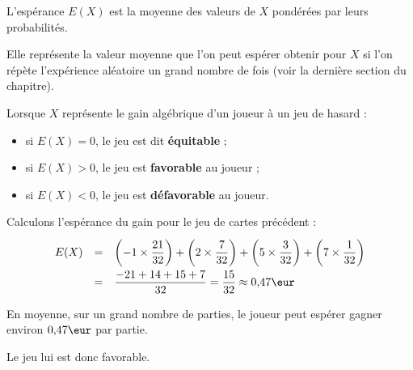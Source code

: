 \begin{rem}
	L'espérance $E(X)$ est la moyenne des valeurs de $X$ pondérées par leurs probabilités.

	Elle représente la valeur moyenne que l'on peut espérer obtenir pour $X$ si l'on répète l'expérience aléatoire un grand nombre de fois (voir la dernière section du chapitre).
\end{rem}

\begin{definition}
	Lorsque $X$ représente le gain algébrique d'un joueur à un jeu de hasard :
	\begin{itemize}
		\item si $E(X) = 0$, le jeu est dit \textbf{équitable} ;
		\item si $E(X) > 0$, le jeu est \textbf{favorable} au joueur ;
		\item si $E(X) < 0$, le jeu est \textbf{défavorable} au joueur.
	\end{itemize}
\end{definition}

\begin{ex}
	Calculons l'espérance du gain pour le jeu de cartes précédent :
	\[
		\def\arraystretch{2}
		\begin{array}{rcl}
			E(X) & = & \left(-1 \times \dfrac{21}{32}\right) + \left(2 \times \dfrac{7}{32}\right) + \left(5 \times \dfrac{3}{32}\right) + \left(7 \times \dfrac{1}{32}\right) \\
			     & = & \dfrac{-21 + 14 + 15 + 7}{32} = \dfrac{15}{32} \approx 0{,}47\eur
		\end{array}
	\]

	En moyenne, sur un grand nombre de parties, le joueur peut espérer gagner environ $0{,}47\eur$ par partie.

	Le jeu lui est donc favorable.
\end{ex}

